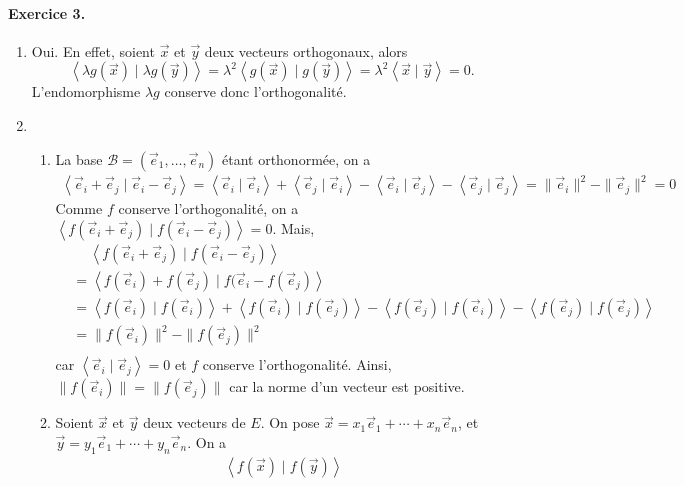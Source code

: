 \documentclass[a4paper]{article}
\begin{document}
	\paragraph{Exercice 3.}
	\begin{enumerate}
		\item Oui. En effet, soient $\vec{x}$\/ et $\vec{y}$\/ deux vecteurs orthogonaux, alors \[
				\left<\lambda g(\vec{x})  \mid \lambda g(\vec{y}) \right> = \lambda^2 \left<g(\vec{x})  \mid g(\vec{y}) \right> = \lambda^2 \left<\vec{x}  \mid \vec{y} \right> = 0
			.\] L'endomorphisme $\lambda g$\/ conserve donc l'orthogonalité.
		\item
			\begin{enumerate}
				\item La base $\mathcal{B} = (\vec{e}_1, \ldots, \vec{e}_n)$\/ étant orthonormée, on a
					\begin{align*}
					\left<\vec{e}_i + \vec{e}_j  \mid \vec{e}_i - \vec{e}_j \right> = \left<\vec{e}_i  \mid \vec{e}_i \right> + \left< \vec{e}_j  \mid \vec{e}_i \right> - \left<\vec{e}_i  \mid \vec{e}_j \right> - \left<\vec{e}_j  \mid \vec{e}_j \right> = \|\vec{e}_i\|^2 - \|\vec{e}_j\|^2 = 0
					\end{align*}
					Comme $f$\/ conserve l'orthogonalité, on a $\left<f(\vec{e}_i + \vec{e}_j)  \mid f(\vec{e}_i - \vec{e}_j) \right> = 0$.
					Mais,
					\begin{align*}
						&\quad\:\left<f(\vec{e}_i + \vec{e}_j)  \mid f(\vec{e}_i - \vec{e}_j) \right>\\
						&= \left<f(\vec{e}_i) + f(\vec{e}_j)  \mid f(\vec{e}_i - f(\vec{e}_j) \right> \\
						&= \left<f(\vec{e}_i)  \mid f(\vec{e}_i) \right> + \left< f(\vec{e}_i) \mid f(\vec{e}_j) \right> - \left<f(\vec{e}_j)  \mid f(\vec{e}_i) \right> - \left<f(\vec{e}_j)  \mid f(\vec{e}_j) \right> \\
						&= \|f(\vec{e}_i)\|^2  - \|f(\vec{e}_j)\|^2\\
					\end{align*}
					car $\left<\vec{e}_i  \mid \vec{e}_j \right> = 0$\/ et $f$\/ conserve l'orthogonalité. Ainsi, $\|f(\vec{e}_i)\| = \|f(\vec{e}_j)\|$\/ car la norme d'un vecteur est positive.
				\item Soient $\vec{x}$\/ et $\vec{y}$\/ deux vecteurs de $E$.
					On pose $\vec{x} = x_1 \vec{e}_1 + \cdots + x_n \vec{e}_n$, et $\vec{y} = y_1 \vec{e}_1 + \cdots + y_n \vec{e}_n$.
					On a
					\begin{align*}
						\left<f(\vec{x}) \mid f(\vec{y}) \right>

\end{align*}
\end{enumerate}
\end{enumerate}
\end{document}
